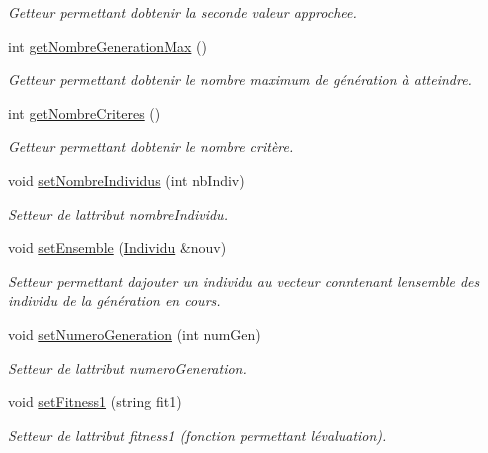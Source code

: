 \begin{DoxyCompactItemize}
\begin{DoxyCompactList}\small\item\em Getteur permettant d\textquotesingle{}obtenir la seconde valeur approchee. \end{DoxyCompactList}\item 
int \hyperlink{class_population_aa07616afcf9ba7435e6648925a9dd73a}{get\+Nombre\+Generation\+Max} ()
\begin{DoxyCompactList}\small\item\em Getteur permettant d\textquotesingle{}obtenir le nombre maximum de génération à atteindre. \end{DoxyCompactList}\item 
int \hyperlink{class_population_aa55e37f348f9de0e3b2fe9a0de7d2bb3}{get\+Nombre\+Criteres} ()
\begin{DoxyCompactList}\small\item\em Getteur permettant d\textquotesingle{}obtenir le nombre critère. \end{DoxyCompactList}\item 
void \hyperlink{class_population_ac6f1644f7297b6b9521409b332f51f0d}{set\+Nombre\+Individus} (int nb\+Indiv)
\begin{DoxyCompactList}\small\item\em Setteur de l\textquotesingle{}attribut nombre\+Individu. \end{DoxyCompactList}\item 
void \hyperlink{class_population_a1c15a197054721dfbcdbb4a7882b3e95}{set\+Ensemble} (\hyperlink{class_individu}{Individu} \&nouv)
\begin{DoxyCompactList}\small\item\em Setteur permettant d\textquotesingle{}ajouter un individu au vecteur conntenant l\textquotesingle{}ensemble des individu de la génération en cours. \end{DoxyCompactList}\item 
void \hyperlink{class_population_a556851b48bc213bc9a5624295710276d}{set\+Numero\+Generation} (int num\+Gen)
\begin{DoxyCompactList}\small\item\em Setteur de l\textquotesingle{}attribut numero\+Generation. \end{DoxyCompactList}\item 
void \hyperlink{class_population_a7573ba5ab354228ffcb76c7dd43b5205}{set\+Fitness1} (string fit1)
\begin{DoxyCompactList}\small\item\em Setteur de l\textquotesingle{}attribut fitness1 (fonction permettant l\textquotesingle{}évaluation). \end{DoxyCompactList}\item 

\end{DoxyCompactItemize}
